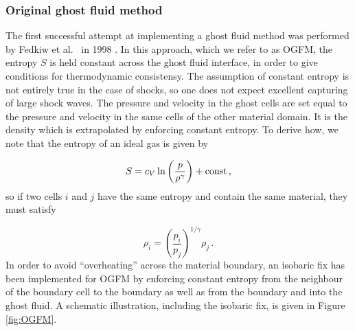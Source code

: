 \documentclass[final,3p,twocolumn]{elsarticle}
\begin{document}
\subsubsection{Original ghost fluid method}
\label{subsubsec:ogfm}

The first successful attempt at implementing a ghost fluid method was performed by
Fedkiw et al.~ in 1998 \cite{fedkiw1999nonoscillatory}. In this approach, which
we refer to as OGFM, the entropy $S$ is held constant across the ghost fluid
interface, in order to give conditions for thermodynamic consistensy. The
assumption of constant entropy is not entirely true in the case of shocks, so
one does not expect excellent capturing of large shock waves. The pressure and
velocity in the ghost cells are set equal to the pressure and velocity in the
same cells of the other material domain. It is the density which is
extrapolated by enforcing constant entropy. To derive how, we note that the
entropy of an ideal gas is given by 

\begin{equation}
    \label{eq:entropy}
    S = c_V \ln \left( \frac{p}{\rho^{\gamma}} \right) + {\rm const} \,,
\end{equation}
%
so if two cells $i$ and $j$ have the same entropy and contain the same
material, they must satisfy 

\begin{equation}
    \label{eq:constEntropy}
    \rho_i = \left( \frac{p_i}{p_j} \right)^{1/\gamma} \rho_j \,.
\end{equation}
%
In order to avoid ``overheating'' across the material boundary, an isobaric fix
has been implemented for OGFM by enforcing constant entropy from the neighbour
of the boundary cell to the boundary as well as from the boundary and into
the ghost fluid. A schematic illustration, including the isobaric fix, is given
in Figure \ref{fig:OGFM}. 
\end{document}
